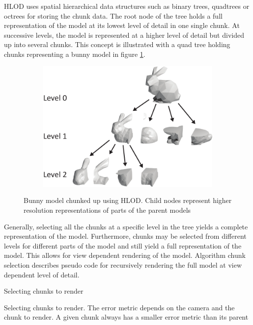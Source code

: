HLOD uses spatial hierarchical data structures such as binary trees, quadtrees or octrees for storing the chunk data. The root node of the tree holds a full representation of the model at its lowest level of detail in one single chunk. At successive levels, the model is represented at a higher level of detail but divided up into several chunks. This concept is illustrated with a quad tree holding chunks representing a bunny model in figure \ref{fig:hlod}.

\begin{figure}[htbp]
    \centering
    \begin{subfigure}[bt]{0.6\textwidth}
        \includegraphics[width=\textwidth]{figures/lod/hlod.pdf}
    \end{subfigure}
    \caption{Bunny model chunked up using HLOD. Child nodes represent higher resolution representations of parts of the parent models}
    \label{fig:hlod}
\end{figure}

Generally, selecting all the chunks at a specific level in the tree yields a complete representation of the model. Furthermore, chunks may be selected from different levels for different parts of the model and still yield a full representation of the model. This allows for view dependent rendering of the model. Algorithm chunk selection describes pseudo code for recursively rendering the full model at view dependent level of detail.

\begin{algorithm}[htp]
  \caption{Selecting chunks to render}
    \label{alg:chunkselection}
  \caption{Selecting chunks to render. The error metric depends on the camera and the chunk to render. A given chunk always has a smaller error metric than its parent}
\end{algorithm} 

